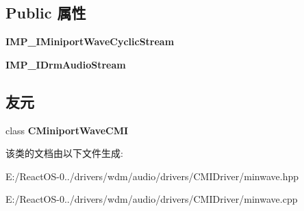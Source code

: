 \subsection*{Public 属性}
\begin{DoxyCompactItemize}
\item 
\mbox{\label{class_c_miniport_wave_stream_c_m_i_a6f2b1a01fb7517052904a9e93be33111}} 
{\bfseries I\+M\+P\+\_\+\+I\+Miniport\+Wave\+Cyclic\+Stream}
\item 
\mbox{\label{class_c_miniport_wave_stream_c_m_i_a39121148fc84e30b317940a5fee8d530}} 
{\bfseries I\+M\+P\+\_\+\+I\+Drm\+Audio\+Stream}
\end{DoxyCompactItemize}
\subsection*{友元}
\begin{DoxyCompactItemize}
\item 
\mbox{\label{class_c_miniport_wave_stream_c_m_i_a7238826b9a95fa8717ac1b4c70b9ad91}} 
class {\bfseries C\+Miniport\+Wave\+C\+MI}
\end{DoxyCompactItemize}


该类的文档由以下文件生成\+:\begin{DoxyCompactItemize}
\item 
E\+:/\+React\+O\+S-\/0../drivers/wdm/audio/drivers/\+C\+M\+I\+Driver/minwave.\+hpp\item 
E\+:/\+React\+O\+S-\/0../drivers/wdm/audio/drivers/\+C\+M\+I\+Driver/minwave.\+cpp\end{DoxyCompactItemize}
